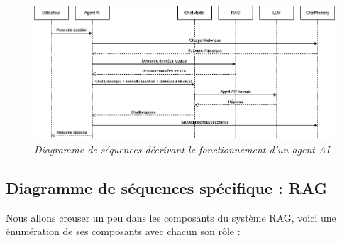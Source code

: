 \documentclass[12pt,a4paper]{report}
\begin{document}
	\begin{figure}[H]
		\centering
		\includegraphics[width=\textwidth]{ds-ai-agent.drawio.png}
		\caption{\textit{Diagramme de séquences décrivant le fonctionnement d'un agent AI}}
		\label{fig:ds-ai-agent.drawio}
	\end{figure}
	
	\subsection{Diagramme de séquences spécifique : RAG}
	
	Nous allons creuser un peu dans les composants du système RAG, voici une énumération de ses composants avec chacun son rôle :
	
\end{document}

